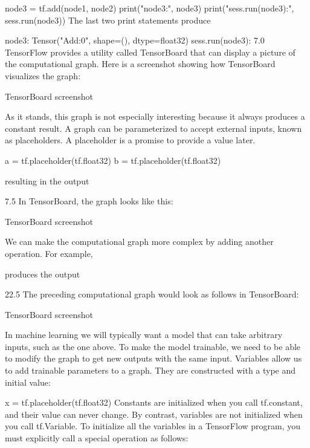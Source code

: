 \documentclass[10pt,a4paper]{ctexbook}
\begin{document}
node3 = tf.add(node1, node2)
print("node3:", node3)
print("sess.run(node3):", sess.run(node3))
The last two print statements produce

node3: Tensor("Add:0", shape=(), dtype=float32)
sess.run(node3): 7.0
TensorFlow provides a utility called TensorBoard that can display a picture of the computational graph. Here is a screenshot showing how TensorBoard visualizes the graph:

TensorBoard screenshot

As it stands, this graph is not especially interesting because it always produces a constant result. A graph can be parameterized to accept external inputs, known as placeholders. A placeholder is a promise to provide a value later.

a = tf.placeholder(tf.float32)
b = tf.placeholder(tf.float32)

resulting in the output

7.5
In TensorBoard, the graph looks like this:

TensorBoard screenshot

We can make the computational graph more complex by adding another operation. For example,

produces the output

22.5
The preceding computational graph would look as follows in TensorBoard:

TensorBoard screenshot

In machine learning we will typically want a model that can take arbitrary inputs, such as the one above. To make the model trainable, we need to be able to modify the graph to get new outputs with the same input. Variables allow us to add trainable parameters to a graph. They are constructed with a type and initial value:

x = tf.placeholder(tf.float32)
Constants are initialized when you call tf.constant, and their value can never change. By contrast, variables are not initialized when you call tf.Variable. To initialize all the variables in a TensorFlow program, you must explicitly call a special operation as follows:
\end{document}
